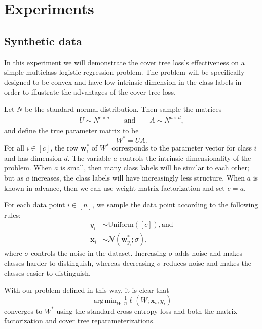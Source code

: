\documentclass[twoside]{article}
\theoremstyle{definition}
\DeclareMathOperator*{\argmin}{arg\,min}
\newcommand{\w}{\mathbf w}
\newcommand{\x}{\mathbf x}
\newcommand{\fixme}[1]{\noindent{\color{red}\textbf{FIXME:}  {#1}}}
\begin{document}
\section{Experiments}

\subsection{Synthetic data}

In this experiment we will demonstrate the cover tree loss's effectiveness on a simple multiclass logistic regression problem.
The problem will be specifically designed to be convex and have low intrinsic dimension in the class labels in order to illustrate the advantages of the cover tree loss.

Let $N$ be the standard normal distribution.
Then sample the matrices
\begin{align}
    U \sim N^{c\times a} \qquad\text{and}\qquad
    A \sim N^{a\times d},
\end{align}
and define the true parameter matrix to be
\begin{equation}
    W^* = UA.
\end{equation}
For all $i \in [c]$, the row $\w_i^*$ of $W^*$ corresponds to the parameter vector for class $i$ and has dimension $d$.
The variable $a$ controls the intrinsic dimensionality of the problem.
When $a$ is small, then many class labels will be similar to each other;
but as $a$ increases, the class labels will have increasingly less structure.
When $a$ is known in advance, then we can use weight matrix factorization and set $e=a$.

For each data point $i\in[n]$,
we sample the data point according to the following rules:
\begin{align}
    y_i &\sim \text{Uniform}([c]), \text{and} \\
    \x_{i} &\sim \mathcal N(\w^*_{y_i}; \sigma),
\end{align}
where $\sigma$ controls the noise in the dataset.
Increasing $\sigma$ adds noise and makes classes harder to distinguish,
whereas decreasing $\sigma$ reduces noise and makes the classes easier to distinguish.

With our problem defined in this way, it is clear that
\begin{equation}
    \argmin_{W} \tfrac 1 n \ell(W; \x_i, y_i)
\end{equation}
converges to $W^*$ using the standard cross entropy loss and both the matrix factorization and cover tree reparameterizations.
\end{document}
